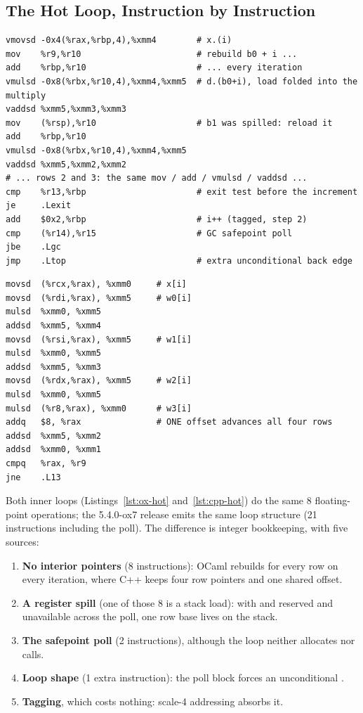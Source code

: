 \subsection{The Hot Loop, Instruction by Instruction}
\label{sec:hotloop}

\begin{lstlisting}[language=asmX,caption={OxCaml 5.2.0+ox, where this work began, unrolled kernel: 23 instructions per 4 MACs.},label=lst:ox-hot]
vmovsd -0x4(%rax,%rbp,4),%xmm4        # x.(i)
mov    %r9,%r10                       # rebuild b0 + i ...
add    %rbp,%r10                      # ... every iteration
vmulsd -0x8(%rbx,%r10,4),%xmm4,%xmm5  # d.(b0+i), load folded into the multiply
vaddsd %xmm5,%xmm3,%xmm3
mov    (%rsp),%r10                    # b1 was spilled: reload it
add    %rbp,%r10
vmulsd -0x8(%rbx,%r10,4),%xmm4,%xmm5
vaddsd %xmm5,%xmm2,%xmm2
# ... rows 2 and 3: the same mov / add / vmulsd / vaddsd ...
cmp    %r13,%rbp                      # exit test before the increment
je     .Lexit
add    $0x2,%rbp                      # i++ (tagged, step 2)
cmp    (%r14),%r15                    # GC safepoint poll
jbe    .Lgc
jmp    .Ltop                          # extra unconditional back edge
\end{lstlisting}

\begin{lstlisting}[language=asmX,caption={C++ with \texttt{-fno-tree-vectorize}: 15 instructions per 4 MACs.},label=lst:cpp-hot]
movsd  (%rcx,%rax), %xmm0     # x[i]
movsd  (%rdi,%rax), %xmm5     # w0[i]
mulsd  %xmm0, %xmm5
addsd  %xmm5, %xmm4
movsd  (%rsi,%rax), %xmm5     # w1[i]
mulsd  %xmm0, %xmm5
addsd  %xmm5, %xmm3
movsd  (%rdx,%rax), %xmm5     # w2[i]
mulsd  %xmm0, %xmm5
mulsd  (%r8,%rax), %xmm0      # w3[i]
addq   $8, %rax               # ONE offset advances all four rows
addsd  %xmm5, %xmm2
addsd  %xmm0, %xmm1
cmpq   %rax, %r9
jne    .L13
\end{lstlisting}

Both inner loops (Listings~\ref{lst:ox-hot} and~\ref{lst:cpp-hot}) do the same
8 floating-point operations; the 5.4.0-ox7 release emits the same loop
structure (21 instructions including the poll). The difference is integer
bookkeeping, with five sources:

\begin{enumerate}
  \item \textbf{No interior pointers} (8 instructions): OCaml rebuilds
         for every row on every iteration, where C++ keeps four
        row pointers and one shared offset.
  \item \textbf{A register spill} (one of those 8 is a stack load): with
         and  reserved and  unavailable across the
        poll, one row base lives on the stack.
  \item \textbf{The safepoint poll} (2 instructions), although the loop
        neither allocates nor calls.
  \item \textbf{Loop shape} (1 extra instruction): the poll block forces an
        unconditional .
  \item \textbf{Tagging}, which costs nothing: scale-4 addressing absorbs it.
\end{enumerate}


